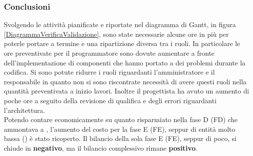	\subsubsection{Conclusioni}
	\label{CCE}
Svolgendo le attività pianificate e riportate nel diagramma di Gantt\glossario{}, in figura \ref{DiagrammaVerificaValidazione}, sono state necessarie alcune ore in più per poterle portare a termine e una ripartizione diversa tra i ruoli. In particolare le ore preventivate per il programmatore sono dovute aumentare a fronte dell'implementazione di componenti che hanno portato a dei problemi durante la codifica. Si sono potute ridurre i ruoli riguardanti l'amministratore e il responsabile in quanto non si sono riscontrate necessità di avere questi ruoli nella quantità preventivata a inizio lavori. Inoltre il progettista ha avuto un aumento di poche ore a seguito della revisione di qualifica e degli errori riguardanti l'architettura.\\
Potendo contare economicamente su quanto risparmiato nella fase D (FD) che ammontava a , l'aumento del costo per la fase  E (FE), seppur di entità molto bassa () è stato ricoperto.
Il bilancio della sola fase E (FE), seppur di poco, si chiude in \textbf{negativo}, ma il bilancio complessivo rimane \textbf{positivo}.\\
\pagebreak